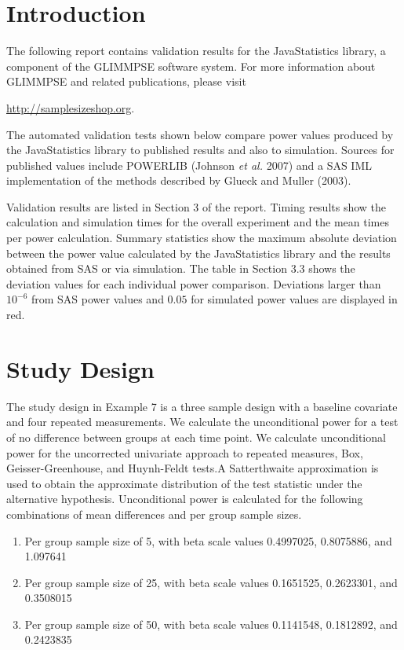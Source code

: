 \documentclass{glimmpse-report}
\begin{document}
\section{Introduction}
The following report contains validation results for the JavaStatistics library, a component of the GLIMMPSE software system.  For more information about GLIMMPSE and related publications, please visit

 

\href{http://samplesizeshop.org}{http://samplesizeshop.org}.

The automated validation tests shown below compare power values produced by the JavaStatistics library to published results and also to simulation.  Sources for published values include POWERLIB (Johnson \emph{et al.} 2007) and a SAS IML implementation of the methods described by Glueck and Muller (2003).

Validation results are listed in Section 3 of the report.  Timing results show the calculation and simulation times for the overall experiment and the mean times per power calculation.  Summary statistics show the maximum absolute deviation between the power value calculated by the JavaStatistics library and the results obtained from SAS or via simulation.  The table in Section 3.3 shows the deviation values for each individual power comparison.  Deviations larger than $10^{-6}$ from SAS power values and $0.05$ for simulated power values are displayed in red.

 \section{Study Design}
The study design in Example 7 is a three sample design with a baseline covariate and four repeated measurements.  We calculate the unconditional power for a test of no difference between groups at each time point.  We calculate unconditional power for the uncorrected univariate approach to repeated measures, Box, Geisser-Greenhouse, and Huynh-Feldt tests.A Satterthwaite approximation is used to obtain the approximate distribution of the test statistic under the alternative hypothesis.  Unconditional power is calculated for the following combinations of mean differences and per group sample sizes.

\begin{enumerate}\item Per group sample size of 5, with beta scale values 0.4997025, 0.8075886, and 1.097641\item Per group sample size of 25, with beta scale values 0.1651525, 0.2623301, and 0.3508015\item Per group sample size of 50, with beta scale values 0.1141548,  0.1812892, and  0.2423835
\end{enumerate}
\end{document}

